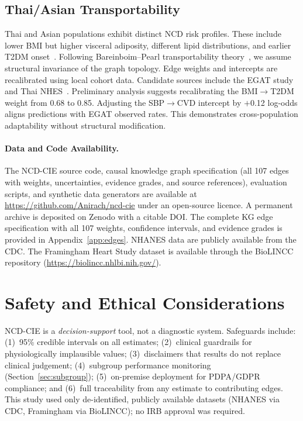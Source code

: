 \documentclass[runningheads]{llncs}
\begin{document}
\subsection{Thai/Asian Transportability}\label{sec:thai}

Thai and Asian populations exhibit distinct NCD risk profiles.
These include lower BMI but higher visceral adiposity, different lipid
distributions, and earlier T2DM
onset~\cite{aekplakorn2011thai}.
Following Bareinboim--Pearl transportability
theory~\cite{bareinboim2016causal}, we assume structural invariance
of the graph topology.
Edge weights and intercepts are recalibrated using local cohort data.
Candidate sources include the EGAT
study~\cite{sritara2003egat} and Thai NHES~\cite{aekplakorn2011thai}.
Preliminary analysis suggests recalibrating the BMI$\rightarrow$T2DM
weight from 0.68 to 0.85.
Adjusting the SBP$\rightarrow$CVD intercept by $+$0.12 log-odds
aligns predictions with EGAT observed rates.
This demonstrates cross-population adaptability without structural
modification.

\paragraph{Data and Code Availability.}
The NCD-CIE source code, causal knowledge graph specification
(all 107 edges with weights, uncertainties, evidence grades, and
source references), evaluation scripts, and synthetic data generators
are available at \url{https://github.com/Anirach/ncd-cie}
under an open-source licence.
A permanent archive is deposited on Zenodo with a citable DOI\@.
The complete KG edge specification with all 107 weights,
confidence intervals, and evidence grades is provided in
Appendix~\ref{app:edges}.
NHANES data are publicly available from the CDC\@.
The Framingham Heart Study dataset is available through the BioLINCC
repository (\url{https://biolincc.nhlbi.nih.gov/}).

\section{Safety and Ethical Considerations}\label{sec:ethics}

NCD-CIE is a \emph{decision-support} tool, not a diagnostic system.
Safeguards include: (1)~95\% credible intervals on all estimates;
(2)~clinical guardrails for physiologically implausible values;
(3)~disclaimers that results do not replace clinical judgement;
(4)~subgroup performance monitoring (Section~\ref{sec:subgroup});
(5)~on-premise deployment for PDPA/GDPR compliance; and
(6)~full traceability from any estimate to contributing edges.
This study used only de-identified, publicly available datasets
(NHANES via CDC, Framingham via BioLINCC); no IRB approval was required.
\end{document}
